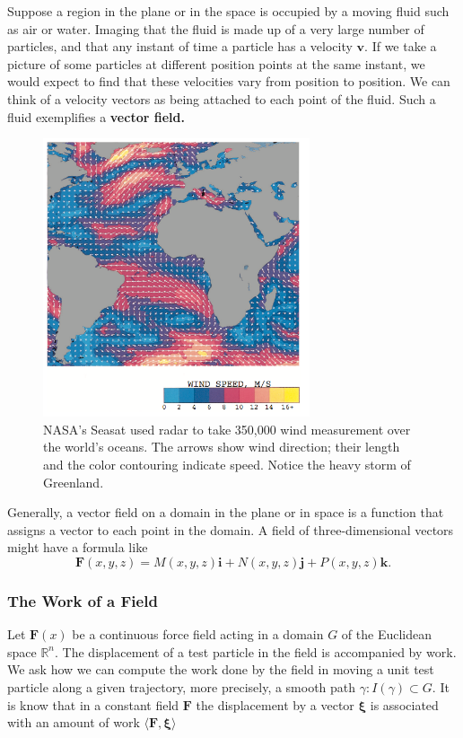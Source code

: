 \documentclass[a4paper,12pt]{article}
\begin{document}
\begin{CJK}{UTF8}{gbsn}
Suppose a region in the plane or in the space is occupied by a moving 
fluid such as air or water. Imaging that the fluid is made up of a 
very large number of particles, and that any instant of time a particle 
has a velocity $\bm{v}$. If we take a picture of some particles at 
different position points at the same instant, we would expect to find 
that these velocities vary from position to position. We can think of a
velocity  vectors as being attached to each point of the fluid. Such a 
fluid exemplifies a \textbf{vector field.}
\graphicspath{
    {../Figs/}
}
\begin{figure}[htbp]
    \centering
    \includegraphics[width=0.7\textwidth]{vector.png}
    \caption{NASA's Seasat used radar to take 350,000 wind measurement 
    over the world's oceans. The arrows show wind direction; their length 
    and the color contouring indicate speed. Notice the heavy storm of Greenland.}
\end{figure}
Generally, a vector field on a domain in the plane or in space is a function 
that assigns a vector to each point in the domain. A field of three-dimensional 
vectors might have a formula like 
\[
    \bm{F}(x,y,z) = M(x,y,z)\bm{i} + N(x,y,z)\bm{j} + P(x,y,z)\bm{k}.
\]
\subsubsection{The Work of a Field}
Let $\bm{F}(x)$ be a continuous force field acting in a domain $G$ of 
the Euclidean space $\mathbb{R}^n$. The displacement of a test particle 
in the field is accompanied by work. We ask how we can compute the work
done by the field in moving a unit test particle along a given trajectory,
more precisely, a smooth path $\gamma: I(\gamma) \subset G $. It is know that in a 
constant field $\bm{F}$ the displacement by a vector $\bm{\xi}$
is associated with an amount of work $\langle \bm{F}, \bm{\xi}\rangle$ 


\end{CJK}
\end{document}
